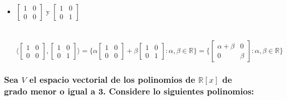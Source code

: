 \documentclass{article}
\begin{document}
\begin{itemize}
	\item
		$\begin{bmatrix} 1&0 \\ 0&0 \end{bmatrix}$ y $\begin{bmatrix} 1&0 \\ 0&1 \end{bmatrix}$ \\ \\ \\
		$\Big\langle \begin{bmatrix} 1&0 \\ 0&0 \end{bmatrix}, \begin{bmatrix} 1&0 \\ 0&1 \end{bmatrix} \Big\rangle
		= \Big\lbrace \alpha \begin{bmatrix} 1&0 \\ 0&0 \end{bmatrix} + \beta \begin{bmatrix}1&0 \\ 0&1 \end{bmatrix}
		: \alpha,\beta \in \mathbb{R}\Big\rbrace = \Big\lbrace \begin{bmatrix} \alpha+\beta & 0 \\ 0 & \beta \end{bmatrix} 
		: \alpha,\beta \in \mathbb{R}\Big\rbrace$
\end{itemize}
\subsubsection{Sea $V$ el espacio vectorial de los polinomios de $\mathbb{R}[x]$ de grado menor o igual a 3. Considere lo siguientes
polinomios: }
\end{document}

